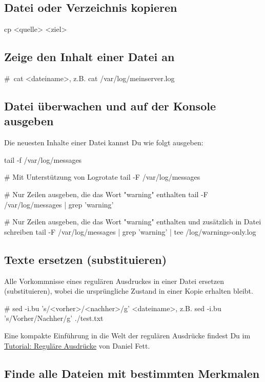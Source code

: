 \documentclass[]{article}
\begin{document}
\subsection{Datei oder Verzeichnis kopieren}
\begin{bashcode}
cp <quelle> <ziel>
\end{bashcode}

\subsection{Zeige den Inhalt einer Datei an}
\begin{bashcode}
# cat <dateiname>, z.B.
cat /var/log/meinserver.log
\end{bashcode}

\subsection{Datei überwachen und auf der Konsole ausgeben}
Die neuesten Inhalte einer Datei kannst Du wie folgt ausgeben:
\begin{bashcode}
tail -f /var/log/messages

# Mit Unterstützung von Logrotate
tail -F /var/log/messages

# Nur Zeilen ausgeben, die das Wort "warning" enthalten
tail -F /var/log/messages | grep 'warning'

# Nur Zeilen ausgeben, die das Wort "warning" enthalten und zusätzlich in Datei schreiben
tail -F /var/log/messages | grep 'warning' | tee /log/warnings-only.log
\end{bashcode}

\subsection{Texte ersetzen (substituieren)}
Alle Vorkommnisse eines regulären Ausdruckes in einer Datei ersetzen (substituieren), wobei die ursprüngliche Zustand in einer Kopie erhalten bleibt.
\begin{bashcode}
# sed -i.bu 's/<vorher>/<nachher>/g' <dateiname>, z.B.
sed -i.bu 's/Vorher/Nachher/g' ./test.txt
\end{bashcode}
Eine kompakte Einführung in die Welt der regulären Ausdrücke findest Du im \href{https://danielfett.de/2006/03/20/regulaere-ausdruecke-tutorial/}{Tutorial: Reguläre Ausdrücke} von Daniel Fett.

\subsection{Finde alle Dateien mit bestimmten Merkmalen} 
\end{document}
